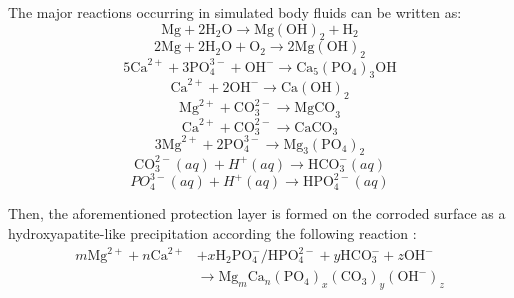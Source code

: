 The major reactions occurring in simulated body fluids can be written as:
\begin{equation}
\mathrm{Mg}+2 \mathrm{H}_{2} \mathrm{O} \rightarrow \mathrm{Mg}(\mathrm{OH})_{2}+\mathrm{H}_{2} 
\end{equation}
\begin{equation}
2 \mathrm{Mg}+2 \mathrm{H}_{2} \mathrm{O}+\mathrm{O}_{2} \rightarrow 2 \mathrm{Mg}(\mathrm{OH})_{2}
\end{equation}
\begin{equation}
5 \mathrm{Ca}^{2+}+3 \mathrm{PO}_{4}^{3-}+\mathrm{OH}^{-} \rightarrow \mathrm{Ca}_{5}\left(\mathrm{PO}_{4}\right)_{3} \mathrm{OH}
\end{equation}
\begin{equation}
\mathrm{Ca}^{2+}+2 \mathrm{OH}^{-} \rightarrow \mathrm{Ca}(\mathrm{OH})_{2}
\end{equation}
\begin{equation}
\mathrm{Mg}^{2+}+\mathrm{CO}_{3}^{2-} \rightarrow \mathrm{MgCO}_{3}
\end{equation}
\begin{equation}
\mathrm{Ca}^{2+}+\mathrm{CO}_{3}^{2-} \rightarrow \mathrm{CaCO}_{3}
\end{equation}
\begin{equation}
 3 \mathrm{Mg}^{2+}+2 \mathrm{PO}_{4}^{3-} \rightarrow \mathrm{Mg}_{3}\left(\mathrm{PO}_{4}\right)_{2}
\end{equation}
\begin{equation}
\mathrm{CO}_{3}^{2-}(a q)+H^{+}(a q) \rightarrow \mathrm{HCO}_{3}^{-}(a q)
\end{equation}
\begin{equation}
P O_{4}^{3-}(a q)+H^{+}(a q)\rightarrow \mathrm{HPO}_{4}^{2-}(a q)
\end{equation}

Then, the aforementioned protection layer is formed on the corroded surface as a hydroxyapatite-like precipitation according the following reaction \cite{Atrens2015,Song2009,Silva2018,Jiang2019}:
\begin{equation}
\begin{aligned}
m \mathrm{Mg}^{2+}+n \mathrm{Ca}^{2+}&+x \mathrm{H}_{2} \mathrm{PO}_{4}^{-} / \mathrm{HPO}_{4}^{2-}+y \mathrm{HCO}_{3}^{-}+z \mathrm{OH}^{-}\\
& \rightarrow \mathrm{Mg}_{m} \mathrm{Ca}_{n}\left(\mathrm{PO}_{4}\right)_{x}\left(\mathrm{CO}_{3}\right)_{y}\left(\mathrm{OH}^{-}\right)_{z}
\end{aligned}
\end{equation}

